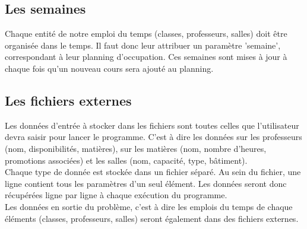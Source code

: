 \documentclass[12pt,a4paper,french]{article}
\begin{document}
\subsection{Les semaines}
Chaque entité de notre emploi du temps (classes, professeurs, salles) doit être organisée dans le temps. Il faut donc leur attribuer un paramètre 'semaine', correspondant à leur planning d'occupation.
Ces semaines sont mises à jour à chaque fois qu'un nouveau cours sera ajouté au planning.

\subsection{Les fichiers externes}
Les données d'entrée à stocker dans les fichiers sont toutes celles que l'utilisateur devra saisir pour lancer le programme. C'est à dire les données sur les professeurs (nom, disponibilités, matières), sur les matières (nom, nombre d'heures, promotions associées) et les salles (nom, capacité, type, bâtiment).\\

Chaque type de donnée est stockée dans un fichier séparé. Au sein du fichier, une ligne contient tous les paramètres d'un seul élément. Les données seront donc récupérées ligne par ligne à chaque exécution du programme.\\

Les données en sortie du problème, c'est à dire les emplois du temps de chaque éléments (classes, professeurs, salles) seront également dans des fichiers externes.
\end{document}
